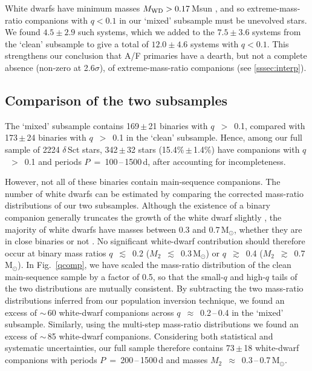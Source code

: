 \documentclass[a4paper,fleqn,usenatbib]{mnras}
\begin{document}
White dwarfs have minimum masses $M_{\rm WD} > 0.17$\,Msun \citep{kilicetal2007a}, and so extreme-mass-ratio companions with $q < 0.1$ in our `mixed' subsample must be unevolved stars. We found $4.5\pm2.9$ such systems, which we added to the $7.5\pm3.6$ systems from the `clean' subsample to give a total of $12.0\pm4.6$ systems with $q<0.1$. This strengthens our conclusion that A/F primaries have a dearth, but not a complete absence (non-zero at 2.6$\sigma$), of extreme-mass-ratio companions (see \ref{sssec:interp}).



\subsection{Comparison of the two subsamples}
\label{sec:comp}

The `mixed' subsample contains 169\,$\pm$\,21 binaries with $q$~$>$~0.1, compared with 173\,$\pm$\,24 binaries with $q$~$>$~0.1 in the `clean' subsample. Hence, among our full sample of 2224 $\delta$\,Sct stars, 342\,$\pm$\,32 stars (15.4\%\,$\pm$\,1.4\%) have companions with $q$~$>$~0.1 and periods $P$~=~100\,--\,1500\,d, after accounting for incompleteness.

However, not all of these binaries contain main-sequence companions. The number of white dwarfs can be estimated by comparing the corrected mass-ratio distributions of our two subsamples. 
Although the existence of a binary companion generally truncates the growth of the white dwarf slightly \citep{pyrzasetal2009}, the majority of white dwarfs have masses between 0.3 and 0.7\,M$_{\odot}$, whether they are in close binaries \citep{rebassa-mansergasetal2012} or not \citep{tremblayetal2016}.
No significant white-dwarf contribution should therefore occur at binary mass ratios $q$~$\lesssim$~0.2 ($M_2$~$\lesssim$~0.3\,M$_{\odot}$) or $q$~$\gtrsim$~0.4 ($M_2$~$\gtrsim$~0.7\,M$_{\odot}$).  In Fig.~\ref{qcomp}, we have scaled the mass-ratio distribution of the clean main-sequence sample by a factor of 0.5, so that the small-$q$ and high-$q$ tails of the two distributions are mutually consistent.  By subtracting the two mass-ratio distributions inferred from our population inversion technique, we found an excess of $\sim$\,60 white-dwarf companions across $q$~$\approx$~0.2\,--\,0.4 in the `mixed' subsample.  Similarly, using the multi-step mass-ratio distributions we found an excess of $\sim$\,85 white-dwarf companions. Considering both statistical and systematic uncertainties, our full sample therefore contains 73\,$\pm$\,18 white-dwarf companions with periods $P$~=~200\,--\,1500\,d and masses $M_2$~$\approx$~0.3\,--\,0.7\,M$_{\odot}$.
\end{document}
